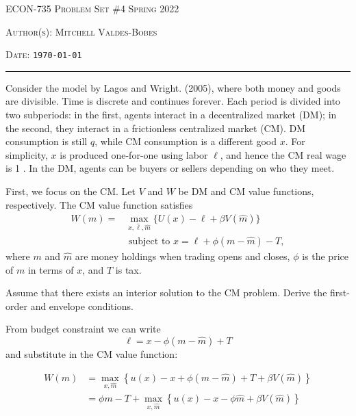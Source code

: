 \documentclass[12pt]{amsart}
\begin{document}
\thispagestyle{empty}


{\scshape ECON-735} \hfill {\scshape \Large Problem Set \#4} \hfill {\scshape Spring 2022}\\
{\scshape Author(s): \hfill Mitchell Valdes-Bobes\\
{\scshape Date: \hfill \texttt{\today}
\medskip

\hrule
\bigskip

\bigskip
\begin{exercise}
Consider the model by Lagos and Wright. (2005), where both money and goods are divisible. Time is discrete and continues forever. Each period is divided into two subperiods: in the first, agents interact in a decentralized market (DM); in the second, they interact in a frictionless centralized market (CM). DM consumption is still $q$, while CM consumption is a different good $x$. For simplicity, $x$ is produced one-for-one using labor $\ell$, and hence the CM real wage is 1 . In the DM, agents can be buyers or sellers depending on who they meet.

First, we focus on the CM. Let $V$ and $W$ be DM and CM value functions, respectively. The CM value function satisfies
$$
\begin{aligned}
W(m)=& \max _{x, \hat{\ell}, \hat{m}}\{U(x)-\ell+\beta V(\hat{m})\} \\
& \text { subject to } x=\ell+\phi(m-\hat{m})-T,
\end{aligned}
$$
where $m$ and $\hat{m}$ are money holdings when trading opens and closes, $\phi$ is the price of $m$ in terms of $x$, and $T$ is tax.
\end{exercise}

\begin{subexercise}
 Assume that there exists an interior solution to the CM problem. Derive the first-order and envelope conditions.
\end{subexercise}

\begin{answer}
 From budget constraint we can write
 $$\ell = x - \phi(m - \hat{m})+T$$
 and substitute in the CM value function:


\begin{align*}
    W(m)&=\max_{x, \hat{m}} \left\{u(x) - x + \phi(m - \hat{m})+T + \beta V(\hat{m})\right\}\\
     &=\phi m - T + \max_{x, \hat{m}} \left\{u(x) - x - \phi \hat{m} + \beta V(\hat{m})\right\}
\end{align*}


\end{answer}}}
\end{document}
